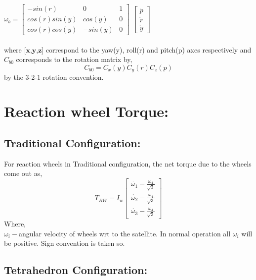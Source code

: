 \documentclass[10pt,a4paper]{report}
\begin{document}
$
\omega_{b} =\begin{bmatrix}
-sin(r) & 0 & 1\\
cos(r) sin(y)&cos(y)&0\\
cos(r) cos(y)&-sin(y)&0
\end{bmatrix}
$ $
\begin{bmatrix}
\dot{p}\\ \dot{r} \\ \dot{y}
\end{bmatrix}
$\\ \\
where [$\textbf{x}$,$\textbf{y}$,$\textbf{z}$]  correspond to the yaw(y), roll(r) and pitch(p) axes respectively and $ C_{b0} $ corresponds to the rotation matrix by,
\begin{equation}
C_{b0}=C_{x}(y)C_{y}(r)C_{z}(p)
\end{equation}
by the 3-2-1 rotation convention.
\section{Reaction wheel Torque:}
\subsection{Traditional Configuration:}
For reaction wheels in Traditional configuration, the net torque due to the wheels come out as,
\begin{equation}
T_{RW}=I_{w}\begin{bmatrix}
\dot{\omega_{1}}-\frac{\omega_{4}}{\sqrt{3}}\\
\dot{\omega_{2}}-\frac{\omega_{4}}{\sqrt{3}}\\
\dot{\omega_{3}}-\frac{\omega_{4}}{\sqrt{3}}
\end{bmatrix}
\end{equation}
Where, \\
$\omega_{i}-$angular velocity of wheels wrt to the satellite. In normal operation all $\omega_{i}$ will be positive. Sign convention is taken so. \\

\newpage
\subsection{Tetrahedron Configuration:}
\end{document}
